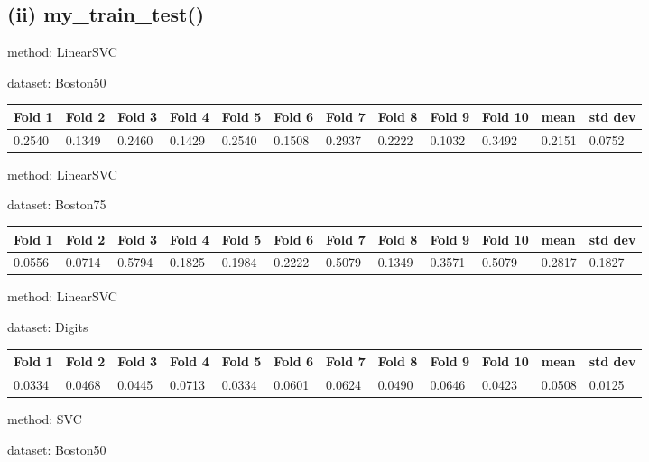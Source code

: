\documentclass{article}
\begin{document}

\subsection{(ii) my\_train\_test()}

\noindent method: LinearSVC

\noindent dataset: Boston50

\begin{center}
	\begin{tabular}  { | l | l | l | l | l | l | l | l | l | l | l | l | }
	\hline
	Fold 1 & Fold 2 & Fold 3 & Fold 4 & Fold 5 & Fold 6 & Fold 7 & Fold 8 & Fold 9 & Fold 10 & mean & std dev\\ \hline
	0.2540 & 0.1349 & 0.2460 & 0.1429 & 0.2540 & 0.1508 & 0.2937 & 0.2222 & 0.1032 & 0.3492 & 0.2151 & 0.0752\\
	\hline
	\end{tabular}
\end{center}
\noindent method: LinearSVC

\noindent dataset: Boston75

\begin{center}
	\begin{tabular}  { | l | l | l | l | l | l | l | l | l | l | l | l | }
	\hline
	Fold 1 & Fold 2 & Fold 3 & Fold 4 & Fold 5 & Fold 6 & Fold 7 & Fold 8 & Fold 9 & Fold 10 & mean & std dev\\ \hline
	0.0556 & 0.0714 & 0.5794 & 0.1825 & 0.1984 & 0.2222 & 0.5079 & 0.1349 & 0.3571 & 0.5079 & 0.2817 & 0.1827\\
	\hline
	\end{tabular}
\end{center}
\noindent method: LinearSVC

\noindent dataset: Digits

\begin{center}
	\begin{tabular}  { | l | l | l | l | l | l | l | l | l | l | l | l | }
	\hline
	Fold 1 & Fold 2 & Fold 3 & Fold 4 & Fold 5 & Fold 6 & Fold 7 & Fold 8 & Fold 9 & Fold 10 & mean & std dev\\ \hline
	0.0334 & 0.0468 & 0.0445 & 0.0713 & 0.0334 & 0.0601 & 0.0624 & 0.0490 & 0.0646 & 0.0423 & 0.0508 & 0.0125\\
	\hline
	\end{tabular}
\end{center}
\noindent method: SVC

\noindent dataset: Boston50
\end{document}
